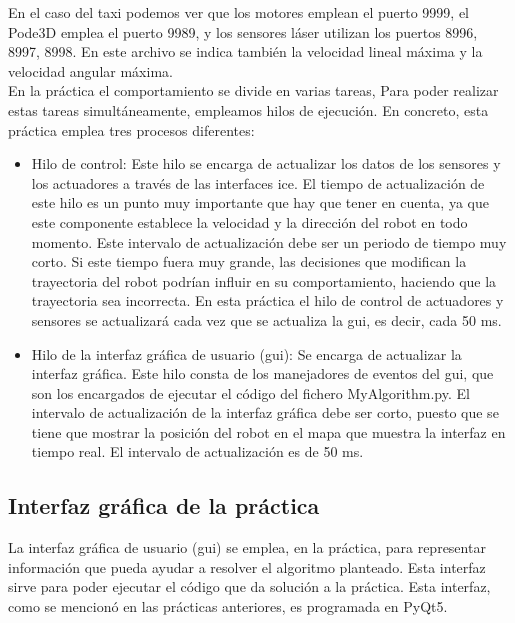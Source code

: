 En el caso del taxi podemos ver que los motores emplean el puerto 9999, el Pode3D emplea el puerto 9989, y los sensores láser utilizan los puertos 8996, 8997, 8998. En este archivo se indica también la velocidad lineal máxima y la velocidad angular máxima.\\

En la práctica el comportamiento se divide en varias tareas, Para poder realizar estas tareas simultáneamente, empleamos hilos de ejecución. En concreto, esta práctica emplea tres procesos diferentes:

\begin{itemize}
\item Hilo de control: Este hilo se encarga de actualizar los datos de los sensores y los actuadores a través de las interfaces \acrshort{ice}. El tiempo de actualización de este hilo es un punto muy importante que hay que tener en cuenta, ya que este componente establece la velocidad y la dirección del robot en todo momento. Este intervalo de actualización debe ser un periodo de tiempo muy corto. Si este tiempo fuera muy grande, las decisiones que modifican la trayectoria del robot podrían influir en su comportamiento, haciendo que la trayectoria sea incorrecta. En esta práctica el hilo de control de actuadores y sensores se actualizará cada vez que se actualiza la \acrshort{gui}, es decir, cada 50 ms.
\item	Hilo de la interfaz gráfica de usuario (\acrshort{gui}): Se encarga de actualizar la interfaz gráfica. Este hilo consta de los manejadores de eventos del \acrshort{gui}, que son los encargados de ejecutar el código del fichero MyAlgorithm.py. El intervalo de actualización de la interfaz gráfica debe ser corto, puesto que se tiene que mostrar la posición del robot en el mapa que muestra la interfaz en tiempo real. El intervalo de actualización es de 50 ms.

\end{itemize}

\subsection{Interfaz gráfica de la práctica}
La interfaz gráfica de usuario (\acrshort{gui}) se emplea, en la práctica, para representar información que pueda ayudar a resolver el algoritmo planteado. Esta interfaz sirve para poder ejecutar el código que da solución a la práctica. Esta interfaz, como se mencionó en las prácticas anteriores, es programada en PyQt5.\\

